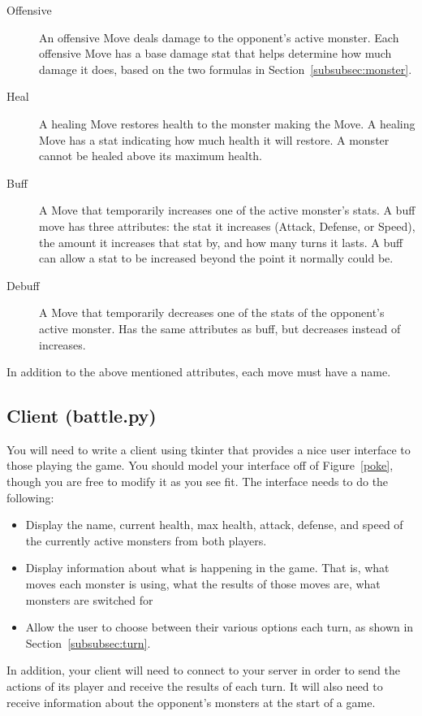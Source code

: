 \documentclass[11pt]{cselabheader}
\begin{document}
\begin{description}
\item[Offensive] An offensive Move deals damage to the opponent's active monster.
  Each offensive Move has a base damage stat that helps determine how much damage it
  does, based on the two formulas in Section~\ref{subsubsec:monster}.
\item[Heal] A healing Move restores health to the monster making the Move. A healing
  Move has a stat indicating how much health it will restore. A monster cannot be
  healed above its maximum health.
\item[Buff] A Move that temporarily increases one of the active monster's stats. A buff move
  has three attributes: the stat it increases (Attack, Defense, or Speed), the
  amount it increases that stat by, and how many turns it lasts. A buff can allow a stat
  to be increased beyond the point it normally could be.
\item[Debuff] A Move that temporarily decreases one of the stats of the opponent's active
  monster. Has the same attributes as buff, but decreases instead of increases.
\end{description}

In addition to the above mentioned attributes, each move must have a name.

\subsection{Client (battle.py)}
You will need to write a client using tkinter that provides a nice user interface
to those playing the game. You should model your interface off of
Figure~\ref{poke}, though you are free to modify it as you see fit. The interface
needs to do the following:
\begin{itemize}
\item Display the name, current health, max health, attack, defense, and speed of the
  currently active monsters from both players.
\item Display information about what is happening in the game. That is, what moves each
  monster is using, what the results of those moves are, what monsters are switched for
\item Allow the user to choose between their various options each turn, as shown in
  Section~\ref{subsubsec:turn}.
\end{itemize}

In addition, your client will need to connect to your server in order to send the
actions of its player and receive the results of each turn. It will also need to
receive information about the opponent's monsters at the start of a game.
\end{document}
